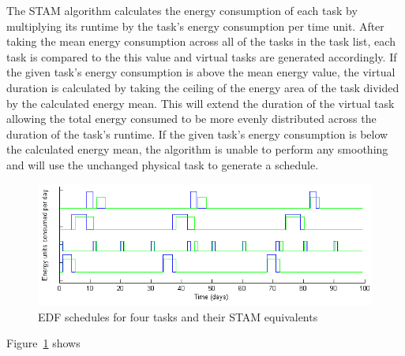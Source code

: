 The \textsc{STAM} algorithm calculates the energy consumption of each task by multiplying its runtime by the task's energy consumption per time unit. After taking the mean energy consumption across all of the tasks in the task list, each task is compared to the this value and virtual tasks are generated accordingly. If the given task's energy consumption is above the mean energy value, the virtual duration is calculated by taking the ceiling of the energy area of the task divided by the calculated energy mean. This will extend the duration of the virtual task allowing the total energy consumed to be more evenly distributed across the duration of the task's runtime. If the given task's energy consumption is below the calculated energy mean, the algorithm is unable to perform any smoothing and  will use the unchanged physical task to generate a schedule.
\begin{figure}[htb]
\includegraphics[scale=0.38]{stamtasks.png}
\caption{EDF schedules for four tasks and their STAM equivalents}
\label{fig:stamtaskplot}
\end{figure}

Figure~\ref{fig:stamtaskplot} shows 